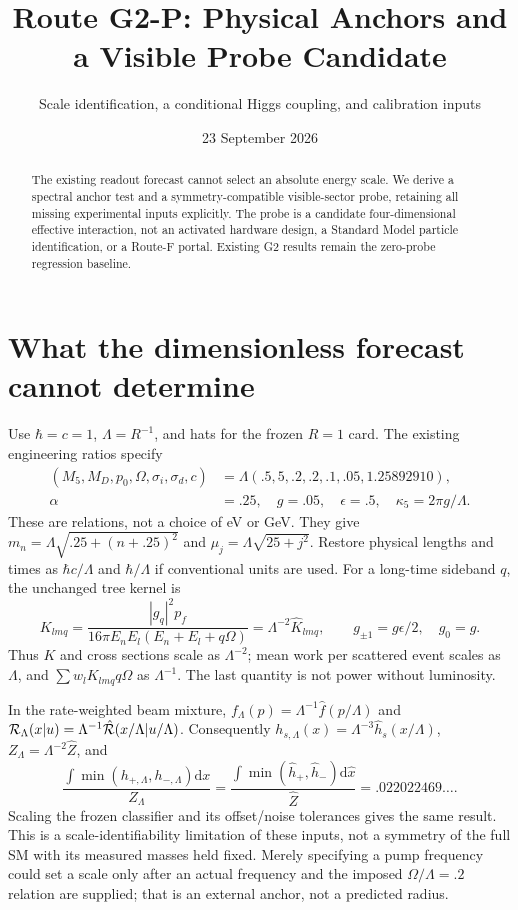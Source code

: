 \documentclass[11pt,a4paper]{article}
\title{Route G2-P: Physical Anchors and a Visible Probe Candidate}
\author{Scale identification, a conditional Higgs coupling, and calibration inputs}
\date{23 September 2026}
\newcommand{\dd}{\mathrm d}
\begin{document}
\maketitle
\begin{abstract}
The existing readout forecast cannot select an absolute energy scale.
We derive a spectral anchor test and a symmetry-compatible visible-sector
probe, retaining all missing experimental inputs explicitly. The probe
is a candidate four-dimensional effective interaction, not an activated
hardware design, a Standard Model particle identification, or a Route-F
portal. Existing G2 results remain the zero-probe regression baseline.
\end{abstract}

\section{What the dimensionless forecast cannot determine}
Use $\hbar=c=1$, $\Lambda=R^{-1}$, and hats for the frozen $R=1$ card.
The existing engineering ratios specify
\begin{align}
 (M_5,M_D,p_0,\Omega,\sigma_i,\sigma_d,c)
 &=\Lambda(.5,5,.2,.2,.1,.05,1.25892910),\\
 \alpha&=.25,\quad g=.05,\quad\epsilon=.5,\quad
 \kappa_5=2\pi g/\Lambda .
\end{align}
These are relations, not a choice of eV or GeV. They give
$m_n=\Lambda\sqrt{.25+(n+.25)^2}$ and
$\mu_j=\Lambda\sqrt{25+j^2}$. Restore physical lengths and times as
$\hbar c/\Lambda$ and $\hbar/\Lambda$ if conventional units are used.
For a long-time sideband $q$, the unchanged tree kernel is
\begin{equation}
 K_{lmq}=\frac{|g_q|^2p_f}{16\pi E_nE_l(E_n+E_l+q\Omega)}
          =\Lambda^{-2}\widehat K_{lmq},
 \qquad g_{\pm1}=g\epsilon/2,\quad g_0=g.
\end{equation}
Thus $K$ and cross sections scale as $\Lambda^{-2}$; mean work per
scattered event scales as $\Lambda$, and $\sum w_l K_{lmq}q\Omega$
as $\Lambda^{-1}$. The last quantity is not power without luminosity.

In the rate-weighted beam mixture, $f_\Lambda(p)=\Lambda^{-1}\hat f(p/\Lambda)$
and ${\cal R}_\Lambda(x|u)=\Lambda^{-1}\hat{\cal R}(x/\Lambda|u/\Lambda)$.
Consequently $h_{s,\Lambda}(x)=\Lambda^{-3}\hat h_s(x/\Lambda)$,
$Z_\Lambda=\Lambda^{-2}\hat Z$, and
\begin{equation}
 \frac{\int\min(h_{+,\Lambda},h_{-,\Lambda})\dd x}{Z_\Lambda}
 =\frac{\int\min(\hat h_+,\hat h_-)\dd\hat x}{\hat Z}
 =.022022469\ldots .
\end{equation}
Scaling the frozen classifier and its offset/noise tolerances gives the
same result. This is a scale-identifiability limitation of these inputs,
not a symmetry of the full SM with its measured masses held fixed.
Merely specifying a pump frequency could set a scale only after an
actual frequency and the imposed $\Omega/\Lambda=.2$ relation are supplied;
that is an external anchor, not a predicted radius.
\end{document}
